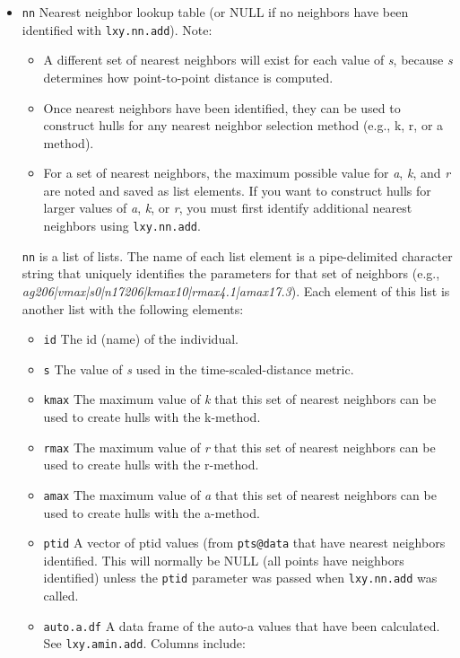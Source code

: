 \documentclass{article}
\begin{document}
\begin{itemize}
  \item \texttt{nn} Nearest neighbor lookup table (or NULL if no neighbors have been identified with \texttt{lxy.nn.add}). Note:

  \begin{itemize}
    \item A different set of nearest neighbors will exist for each value of \emph{s}, because \emph{s} determines how point-to-point distance is computed.
    \item Once nearest neighbors have been identified, they can be used to construct hulls for any nearest neighbor selection method (e.g., k, r, or a method).
    \item For a set of nearest neighbors, the maximum possible value for \emph{a}, \emph{k}, and \emph{r} are noted and saved as list elements. If you want to construct hulls for larger values of \emph{a}, \emph{k}, or \emph{r}, you must first identify additional nearest neighbors using \texttt{lxy.nn.add}.
  \end{itemize}  

\texttt{nn} is a list of lists. The name of each list element is a pipe-delimited character string that uniquely identifies the parameters for that set of neighbors (e.g., \emph{ag206|vmax|s0|n17206|kmax10|rmax4.1|amax17.3}). Each element of this list is another list with the following elements:

  \begin{itemize}
    \item \texttt{id} The id (name) of the individual.
    \item \texttt{s} The value of \textit{s} used in the time-scaled-distance metric.
    \item \texttt{kmax} The maximum value of \textit{k} that this set of nearest neighbors can be used to create hulls with the k-method.
    \item \texttt{rmax} The maximum value of \textit{r} that this set of nearest neighbors can be used to create hulls with the r-method.
    \item \texttt{amax} The maximum value of \textit{a} that this set of nearest neighbors can be used to create hulls with the a-method.
    \item \texttt{ptid} A vector of ptid values (from \texttt{pts@data} that have nearest neighbors identified. This will normally be NULL (all points have neighbors identified) unless the \texttt{ptid} parameter was passed when \texttt{lxy.nn.add} was called.
    \item \texttt{auto.a.df} A data frame of the auto-a values that have been calculated. See \texttt{lxy.amin.add}. Columns include:


\end{itemize}
\end{itemize}
\end{document}

